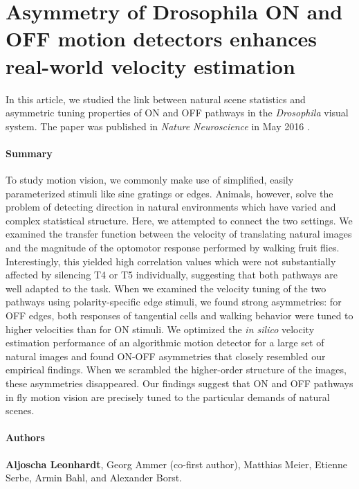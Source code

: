 \section{Asymmetry of Drosophila ON and OFF motion detectors enhances real-world velocity estimation}
\label{sct:manuscript_leonhardt}

In this article, we studied the link between natural scene statistics and asymmetric tuning properties of ON and OFF pathways in the \textit{Drosophila} visual system. The paper was published in \textit{Nature Neuroscience} in May 2016 \citep{Leonhardt:2016ex}.

\paragraph{Summary}
To study motion vision, we commonly make use of simplified, easily parameterized stimuli like sine gratings or edges. Animals, however, solve the problem of detecting direction in natural environments which have varied and complex statistical structure. Here, we attempted to connect the two settings. We examined the transfer function between the velocity of translating natural images and the magnitude of the optomotor response performed by walking fruit flies. Interestingly, this yielded high correlation values which were not substantially affected by silencing T4 or T5 individually, suggesting that both pathways are well adapted to the task. When we examined the velocity tuning of the two pathways using polarity-specific edge stimuli, we found strong asymmetries: for OFF edges, both responses of tangential cells and walking behavior were tuned to higher velocities than for ON stimuli. We optimized the \textit{in silico} velocity estimation performance of an algorithmic motion detector for a large set of natural images and found ON-OFF asymmetries that closely resembled our empirical findings. When we scrambled the higher-order structure of the images, these asymmetries disappeared. Our findings suggest that ON and OFF pathways in fly motion vision are precisely tuned to the particular demands of natural scenes.

\paragraph{Authors} \textbf{Aljoscha Leonhardt}, Georg Ammer (co-first author), Matthias Meier, Etienne Serbe, Armin Bahl, and Alexander Borst.

